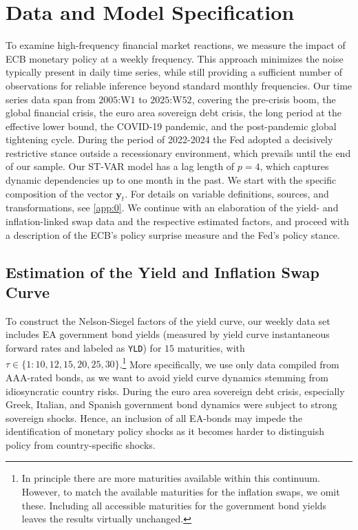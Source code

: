 \section{Data and Model Specification}\label{sec:Data}
To examine high-frequency financial market reactions, we measure the impact of ECB monetary policy at a weekly frequency. This approach minimizes the noise typically present in daily time series, while still providing a sufficient number of observations for reliable inference beyond standard monthly frequencies. Our time series data span from $2005$:W$1$ to $2025$:W$52$, covering the pre-crisis boom, the global financial crisis, the euro area sovereign debt crisis, the long period at the effective lower bound, the COVID-19 pandemic, and the post-pandemic global tightening cycle. During the period of 2022-2024 the Fed adopted a decisively restrictive stance outside a recessionary environment, which prevails until the end of our sample. Our ST-VAR model has a lag length of $p=4$, which captures dynamic dependencies up to one month in the past.  We start with the specific composition of the vector $\bm y_t$. For details on variable definitions, sources, and transformations, see \autoref{app:0}. We continue with an elaboration of the yield- and inflation-linked swap data and the respective estimated factors, and proceed with a description of the ECB's policy surprise measure and the Fed's policy stance.

\subsection{Estimation of the Yield and Inflation Swap Curve}



To construct the Nelson-Siegel factors of the yield curve, our weekly data set includes EA government bond yields (measured by yield curve instantaneous forward rates and labeled as \texttt{YLD}) for $15$ maturities, with $\tau \in \{1:10,12,15,20,25,30\}$.\footnote{In principle there are more maturities available within this continuum. However, to match the available maturities for the inflation swaps, we omit these. Including all accessible maturities for the government bond yields leaves the results virtually unchanged.} More specifically, we use only data compiled from AAA-rated bonds, as we want to avoid yield curve dynamics stemming from idiosyncratic country risks. During the euro area sovereign debt crisis, especially Greek, Italian, and Spanish government bond dynamics were subject to strong sovereign shocks. Hence,  an inclusion of all EA-bonds may impede the identification of monetary policy shocks as it becomes harder to distinguish policy from country-specific shocks. 

